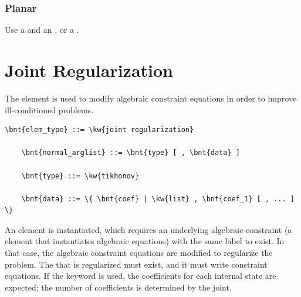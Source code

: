 \subsubsection{Planar}
Use a  and an , or a .




\section{Joint Regularization}
The  element is used to modify
algebraic constraint equations in order to improve ill-conditioned
problems.

\begin{Verbatim}[commandchars=\\\{\}]
    \bnt{elem_type} ::= \kw{joint regularization}

    \bnt{normal_arglist} ::= \bnt{type} [ , \bnt{data} ]

    \bnt{type} ::= \kw{tikhonov}

    \bnt{data} ::= \{ \bnt{coef} | \kw{list} , \bnt{coef_1} [ , ... ] \}
\end{Verbatim}
An element is instantiated, which requires
an underlying algebraic constraint (a  element
that instantiates algebraic equations) with the same label to exist.
In that case, the algebraic constraint equations are modified
to regularize the problem.
The  that is regularized must exist,
and it must write constraint equations.
If the keyword  is used, the coefficients for each internal state
are expected; the number of coefficients is determined by the joint.

